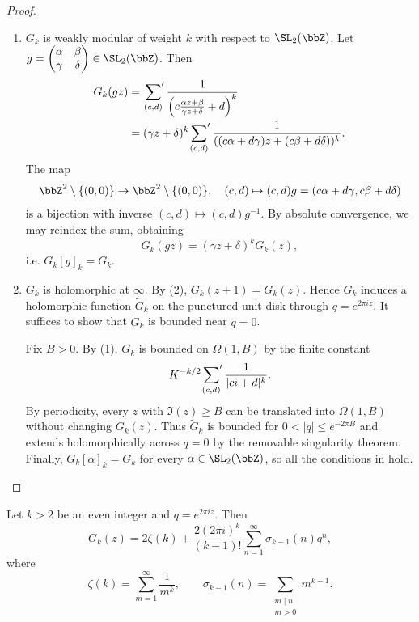\begin{proof}
\begin{enumerate}[label=(\arabic*)]
        \item $G_k$ is weakly modular of weight $k$ with respect to $\SL_2(\bbZ)$.
        Let $g = \begin{pmatrix}\alpha & \beta\\ \gamma & \delta\end{pmatrix} \in \SL_2(\bbZ)$. Then
        \[
            \begin{aligned}
                G_k(gz) &= \sideset{}{'}\sum_{(c, d)} \frac{1}{\left(c\frac{\alpha z + \beta}{\gamma z + \delta} + d\right)^k}\\
                &= (\gamma z + \delta)^k\sideset{}{'}\sum_{(c, d)} \frac{1}{((c\alpha + d\gamma)z + (c\beta + d\delta))^k}.
            \end{aligned}
        \]
        The map
        \[
            \bbZ^2 \setminus \{(0, 0)\} \to \bbZ^2 \setminus \{(0, 0)\}, \quad (c, d) \mapsto (c, d)g = (c\alpha + d\gamma, c\beta + d\delta)
        \]
        is a bijection with inverse $(c, d) \mapsto (c, d)g^{-1}$. By absolute convergence, we may reindex the sum, obtaining
        \[
            G_k(gz) = (\gamma z + \delta)^kG_k(z),
        \]
        i.e. $G_k[g]_k = G_k$.

        \item $G_k$ is holomorphic at $\infty$.
        By (2), $G_k(z + 1) = G_k(z)$. Hence $G_k$ induces a holomorphic function $\widetilde G_k$ on the punctured unit disk through $q = e^{2\pi iz}$. It suffices to show that $\widetilde G_k$ is bounded near $q = 0$.

        Fix $B > 0$. By (1), $G_k$ is bounded on $\Omega(1, B)$ by the finite constant
        \[
            K^{-k/2}\sideset{}{'}\sum_{(c, d)} \frac{1}{|ci + d|^k}.
        \]
        By periodicity, every $z$ with $\Im(z) \geqslant B$ can be translated into $\Omega(1, B)$ without changing $G_k(z)$. Thus $\widetilde G_k$ is bounded for $0 < |q| \leqslant e^{-2\pi B}$ and extends holomorphically across $q = 0$ by the removable singularity theorem. Finally, $G_k[\alpha]_k = G_k$ for every $\alpha \in \SL_2(\bbZ)$, so all the conditions in  hold.
    \end{enumerate}
\end{proof}

\begin{proposition}\label{Prop:MF_Eisenstein_Fourier}
    Let $k > 2$ be an even integer and $q = e^{2\pi iz}$. Then
    \[
        G_k(z) = 2\zeta(k) + \frac{2(2\pi i)^k}{(k - 1)!}\sum_{n = 1}^{\infty}\sigma_{k - 1}(n)q^n,
    \]
    where
    \[
        \zeta(k) = \sum_{m = 1}^{\infty}\frac{1}{m^k}, \qquad \sigma_{k - 1}(n) = \sum_{\substack{m \mid n\\m > 0}}m^{k - 1}.
    \]
\end{proposition}

